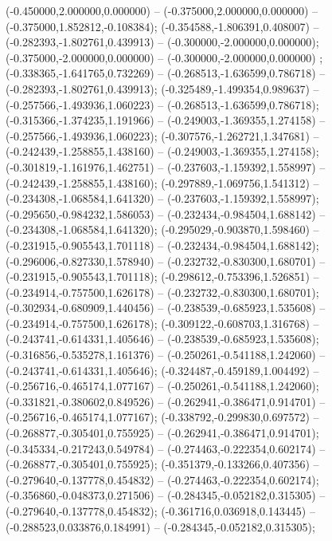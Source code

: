  (-0.450000,2.000000,0.000000) -- (-0.375000,2.000000,0.000000) -- (-0.375000,1.852812,-0.108384);
 (-0.354588,-1.806391,0.408007) -- (-0.282393,-1.802761,0.439913) -- (-0.300000,-2.000000,0.000000);
 (-0.375000,-2.000000,0.000000) -- (-0.300000,-2.000000,0.000000) ;
 (-0.338365,-1.641765,0.732269) -- (-0.268513,-1.636599,0.786718) -- (-0.282393,-1.802761,0.439913);
 (-0.325489,-1.499354,0.989637) -- (-0.257566,-1.493936,1.060223) -- (-0.268513,-1.636599,0.786718);
 (-0.315366,-1.374235,1.191966) -- (-0.249003,-1.369355,1.274158) -- (-0.257566,-1.493936,1.060223);
 (-0.307576,-1.262721,1.347681) -- (-0.242439,-1.258855,1.438160) -- (-0.249003,-1.369355,1.274158);
 (-0.301819,-1.161976,1.462751) -- (-0.237603,-1.159392,1.558997) -- (-0.242439,-1.258855,1.438160);
 (-0.297889,-1.069756,1.541312) -- (-0.234308,-1.068584,1.641320) -- (-0.237603,-1.159392,1.558997);
 (-0.295650,-0.984232,1.586053) -- (-0.232434,-0.984504,1.688142) -- (-0.234308,-1.068584,1.641320);
 (-0.295029,-0.903870,1.598460) -- (-0.231915,-0.905543,1.701118) -- (-0.232434,-0.984504,1.688142);
 (-0.296006,-0.827330,1.578940) -- (-0.232732,-0.830300,1.680701) -- (-0.231915,-0.905543,1.701118);
 (-0.298612,-0.753396,1.526851) -- (-0.234914,-0.757500,1.626178) -- (-0.232732,-0.830300,1.680701);
 (-0.302934,-0.680909,1.440456) -- (-0.238539,-0.685923,1.535608) -- (-0.234914,-0.757500,1.626178);
 (-0.309122,-0.608703,1.316768) -- (-0.243741,-0.614331,1.405646) -- (-0.238539,-0.685923,1.535608);
 (-0.316856,-0.535278,1.161376) -- (-0.250261,-0.541188,1.242060) -- (-0.243741,-0.614331,1.405646);
 (-0.324487,-0.459189,1.004492) -- (-0.256716,-0.465174,1.077167) -- (-0.250261,-0.541188,1.242060);
 (-0.331821,-0.380602,0.849526) -- (-0.262941,-0.386471,0.914701) -- (-0.256716,-0.465174,1.077167);
 (-0.338792,-0.299830,0.697572) -- (-0.268877,-0.305401,0.755925) -- (-0.262941,-0.386471,0.914701);
 (-0.345334,-0.217243,0.549784) -- (-0.274463,-0.222354,0.602174) -- (-0.268877,-0.305401,0.755925);
 (-0.351379,-0.133266,0.407356) -- (-0.279640,-0.137778,0.454832) -- (-0.274463,-0.222354,0.602174);
 (-0.356860,-0.048373,0.271506) -- (-0.284345,-0.052182,0.315305) -- (-0.279640,-0.137778,0.454832);
 (-0.361716,0.036918,0.143445) -- (-0.288523,0.033876,0.184991) -- (-0.284345,-0.052182,0.315305);

